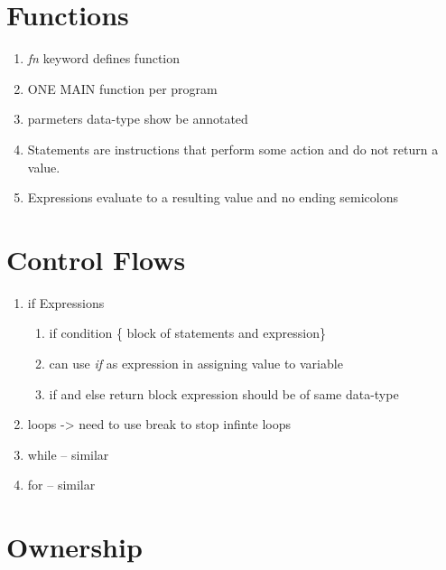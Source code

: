 \documentclass[11pt]{article}
\begin{document}
\section{Functions}
\label{sec-3}

\begin{enumerate}
\item \emph{fn} keyword defines function

\item ONE MAIN function per program

\item parmeters data-type show be annotated

\item Statements are instructions that perform some action and do not return a value.

\item Expressions evaluate to a resulting value and no ending semicolons
\end{enumerate}


\section{Control Flows}
\label{sec-4}

\begin{enumerate}
\item if Expressions

\begin{enumerate}
\item if condition \{ block of statements and expression\}

\item can use \emph{if} as expression in assigning value to variable

\item if and else return block expression should be of same data-type
\end{enumerate}

\item loops ->  need to use break to stop infinte loops

\item while --  similar

\item for --  similar
\end{enumerate}



\section{Ownership}
\label{sec-5}
\end{document}

